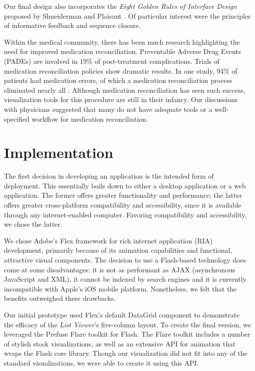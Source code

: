 \documentclass{chi2009}
\newcommand{\ListViewer}{\textit{List Viewer}}
\begin{document}
Our final design also incorporates the \textit{Eight Golden Rules of Interface Design} proposed by Shneiderman and Plaisant \cite{shneiderman}. Of particular interest were the principles of informative feedback and sequence closure.

Within the medical community, there has been much research \cite{JCAHO-2006} \cite{icutool03} highlighting the need for improved medication reconciliation. Preventable Adverse Drug Events (PADEs) are involved in 19\% of post-treatment complications. Trials of medication reconciliation policies show dramatic results. In one study, 94\% of patients had medication errors, of which a medication reconciliation process eliminated nearly all \cite{icutool03}. Although medication reconciliation has seen such  success, visualization tools for this procedure are still in their infancy. Our discussions with physicians suggested that many do not have adequate tools or a well-specified workflow for medication reconciliation. 

\section{Implementation}
The first decision in developing an application is the intended form of deployment. This essentially boils down to either a desktop application or a web application. The former offers greater functionality and performance; the latter offers greater cross-platform compatibility and accessibility, since it is available through any internet-enabled computer. Favoring compatibility and accessibility, we chose the latter.

We chose Adobe's Flex framework for rich internet application (RIA) development, primarily because of its animation capabilities and functional, attractive visual components. The decision to use a Flash-based technology does come at some disadvantages: it is not as performant as AJAX (asynchronous JavaScript and XML), it cannot be indexed by search engines and it is currently incompatible with Apple's iOS mobile platform. Nonetheless, we felt that the benefits outweighed these drawbacks.

Our initial prototype used Flex's default \textsf{DataGrid} component to demonstrate the efficacy of the \ListViewer's five-column layout. To create the final version, we leveraged the Prefuse Flare toolkit for Flash. The Flare toolkit includes a number of stylish stock visualizations, as well as an extensive API for animation that wraps the Flash core library. Though our visualization did not fit into any of the standard visualizations, we were able to create it using this API.
\end{document}
